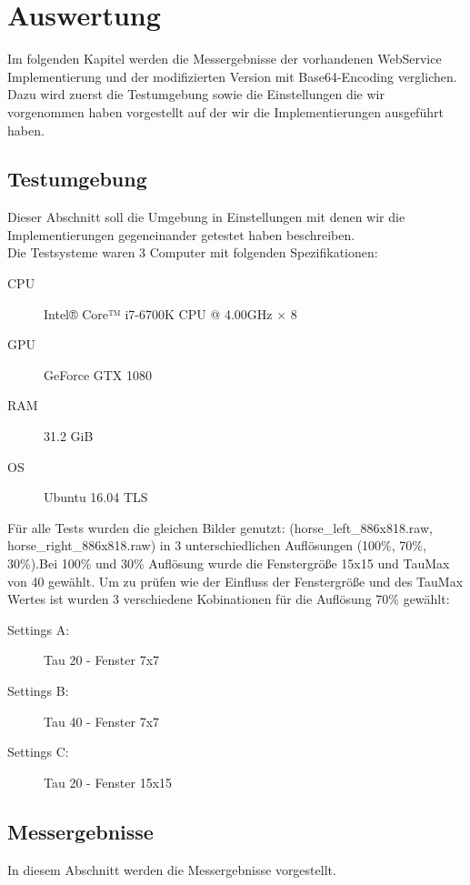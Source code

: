 \section{Auswertung}
Im folgenden Kapitel werden die Messergebnisse der vorhandenen WebService Implementierung und der modifizierten Version mit Base64-Encoding verglichen. 
Dazu wird zuerst die Testumgebung sowie die Einstellungen die wir vorgenommen haben vorgestellt auf der wir die Implementierungen ausgef\"uhrt haben. 

\subsection{Testumgebung}
Dieser Abschnitt soll die Umgebung in Einstellungen mit denen wir die Implementierungen gegeneinander getestet haben beschreiben.\\
Die Testsysteme waren 3 Computer mit folgenden Spezifikationen:

\begin{description}
\item[CPU] Intel® Core™ i7-6700K CPU @ 4.00GHz × 8 
\item[GPU] GeForce GTX 1080
\item[RAM] 31.2 GiB
\item[OS] Ubuntu 16.04 TLS
\end{description}

F\"ur alle Tests wurden die gleichen Bilder genutzt: (horse\_left\_886x818.raw, horse\_right\_886x818.raw) in 3 unterschiedlichen Aufl\"osungen
 (100\%, 70\%, 30\%).Bei 100\% und 30\% Aufl\"osung wurde die Fenstergr\"oße 15x15 und TauMax von 40 gew\"ahlt. 
 Um zu pr\"ufen wie der Einfluss der Fenstergr\"o{\ss}e und des TauMax Wertes ist wurden 3 verschiedene Kobinationen f\"ur die Aufl\"osung 70\% gew\"ahlt:\\

\begin{description}
\item[Settings A:] Tau 20 - Fenster 7x7
\item[Settings B:] Tau 40 - Fenster 7x7
\item[Settings C:] Tau 20 - Fenster 15x15
\end{description}

 

\subsection{Messergebnisse}
In diesem Abschnitt werden die Messergebnisse vorgestellt. 

